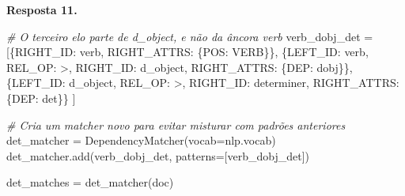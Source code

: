 \documentclass[
  brazilian,
]{article}
\newenvironment{Shaded}{}{}
\newcommand{\CommentTok}[1]{\textcolor[rgb]{0.38,0.63,0.69}{\textit{#1}}}
\newcommand{\NormalTok}[1]{#1}
\newcommand{\OperatorTok}[1]{\textcolor[rgb]{0.40,0.40,0.40}{#1}}
\newcommand{\StringTok}[1]{\textcolor[rgb]{0.25,0.44,0.63}{#1}}
\begin{document}
\textbf{Resposta 11.}

\begin{Shaded}
\begin{Highlighting}[]
\CommentTok{\# O terceiro elo parte de \textquotesingle{}d\_object\textquotesingle{}, e não da âncora \textquotesingle{}verb\textquotesingle{}}
\NormalTok{verb\_dobj\_det }\OperatorTok{=}\NormalTok{ [\{}\StringTok{\textquotesingle{}RIGHT\_ID\textquotesingle{}}\NormalTok{: }\StringTok{\textquotesingle{}verb\textquotesingle{}}\NormalTok{, }\StringTok{\textquotesingle{}RIGHT\_ATTRS\textquotesingle{}}\NormalTok{: \{}\StringTok{\textquotesingle{}POS\textquotesingle{}}\NormalTok{: }\StringTok{\textquotesingle{}VERB\textquotesingle{}}\NormalTok{\}\},}
\NormalTok{                 \{}\StringTok{\textquotesingle{}LEFT\_ID\textquotesingle{}}\NormalTok{: }\StringTok{\textquotesingle{}verb\textquotesingle{}}\NormalTok{, }\StringTok{\textquotesingle{}REL\_OP\textquotesingle{}}\NormalTok{: }\StringTok{\textquotesingle{}\textgreater{}\textquotesingle{}}\NormalTok{, }\StringTok{\textquotesingle{}RIGHT\_ID\textquotesingle{}}\NormalTok{: }\StringTok{\textquotesingle{}d\_object\textquotesingle{}}\NormalTok{,}
                  \StringTok{\textquotesingle{}RIGHT\_ATTRS\textquotesingle{}}\NormalTok{: \{}\StringTok{\textquotesingle{}DEP\textquotesingle{}}\NormalTok{: }\StringTok{\textquotesingle{}dobj\textquotesingle{}}\NormalTok{\}\},}
\NormalTok{                 \{}\StringTok{\textquotesingle{}LEFT\_ID\textquotesingle{}}\NormalTok{: }\StringTok{\textquotesingle{}d\_object\textquotesingle{}}\NormalTok{, }\StringTok{\textquotesingle{}REL\_OP\textquotesingle{}}\NormalTok{: }\StringTok{\textquotesingle{}\textgreater{}\textquotesingle{}}\NormalTok{, }\StringTok{\textquotesingle{}RIGHT\_ID\textquotesingle{}}\NormalTok{: }\StringTok{\textquotesingle{}determiner\textquotesingle{}}\NormalTok{,}
                  \StringTok{\textquotesingle{}RIGHT\_ATTRS\textquotesingle{}}\NormalTok{: \{}\StringTok{\textquotesingle{}DEP\textquotesingle{}}\NormalTok{: }\StringTok{\textquotesingle{}det\textquotesingle{}}\NormalTok{\}\}}
\NormalTok{                ]}

\CommentTok{\# Cria um matcher novo para evitar misturar com padrões anteriores}
\NormalTok{det\_matcher }\OperatorTok{=}\NormalTok{ DependencyMatcher(vocab}\OperatorTok{=}\NormalTok{nlp.vocab)}
\NormalTok{det\_matcher.add(}\StringTok{\textquotesingle{}verb\_dobj\_det\textquotesingle{}}\NormalTok{, patterns}\OperatorTok{=}\NormalTok{[verb\_dobj\_det])}

\NormalTok{det\_matches }\OperatorTok{=}\NormalTok{ det\_matcher(doc)}


\end{Highlighting}
\end{Shaded}
\end{document}
